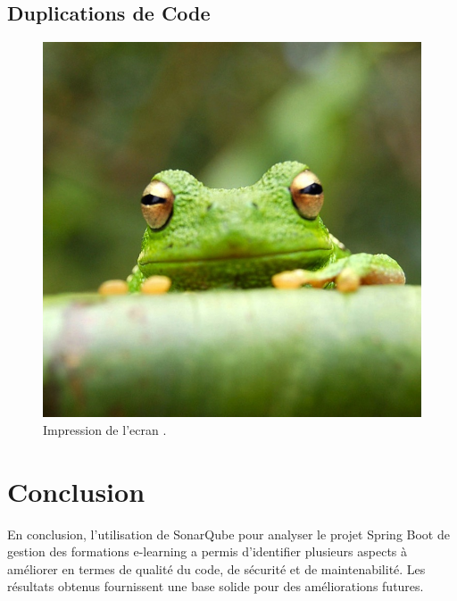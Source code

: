 \documentclass{article}
\begin{document}
\subsection{Duplications de Code}

  \begin{figure}[H]
    \centering
    \includegraphics[width=0.5\linewidth]{assets/frog.jpg}
    \caption{\label{fig:frog19} Impression de l'ecran .}
    \end{figure}
\section{Conclusion}

En conclusion, l'utilisation de SonarQube pour analyser le projet Spring Boot de gestion des formations e-learning a permis d'identifier plusieurs aspects à améliorer en termes de qualité du code, de sécurité et de maintenabilité. Les résultats obtenus fournissent une base solide pour des améliorations futures.


\end{document}
